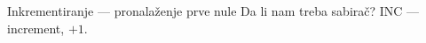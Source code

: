 
\begin{frame}[label=05-s034]{Inkrementiranje — pronalaženje prve nule}
\fontsize{10}{12}\selectfont\setlength{\tabcolsep}{4pt}
Da li nam treba sabirač? INC — increment, $+1$.
\begin{center}\def\DEbroj{34}\def\DEpitanje{Najniža pozicija nule?}\end{center}
\end{frame}
